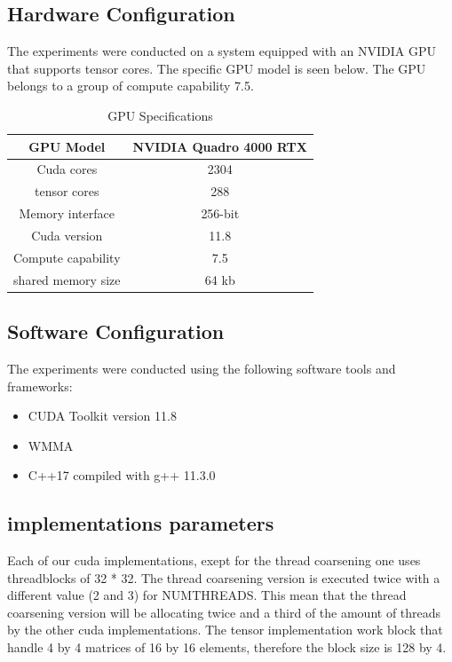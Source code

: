 \documentclass[conference]{IEEEtran}
\begin{document}
  \subsection{Hardware Configuration}\label{sec:hardware-configuration}
  
  The experiments were conducted on a system equipped with an NVIDIA GPU that supports tensor cores.
  The specific GPU model is seen below. The GPU belongs to a group of compute capability 7.5. 
  
  \begin{table}[htbp]
  \caption{GPU Specifications\cite{Voltatuningguide}}
  \centering
    \begin{tabular}{|c|c|}
    \hline
    GPU Model & NVIDIA Quadro 4000 RTX \\
    \hline
    Cuda cores & 2304 \\
    \hline
    tensor cores & 288 \\
    \hline
    Memory interface & 256-bit \\
    \hline
    Cuda version & 11.8 \\
    \hline
    Compute capability & 7.5 \\
    \hline
    shared memory size & 64 kb \\
    \hline
    
  \end{tabular}
  \end{table}
  
  \subsection{Software Configuration}\label{sec:software-configuration}
  
  The experiments were conducted using the following software tools and frameworks:
  
  \begin{itemize}
    \item CUDA Toolkit version 11.8
    \item WMMA
    \item C++17 compiled with g++ 11.3.0
  \end{itemize}
  \subsection{implementations parameters}
  Each of our cuda implementations, exept for the thread coarsening one uses threadblocks of 32 * 32.
  The thread coarsening version is executed twice with a different value (2 and 3) for NUMTHREADS. This
  mean that the thread coarsening version will be allocating twice and a third of the amount of threads
  by the other cuda implementations. The tensor implementation work block that handle 4 by 4 matrices of
  16 by 16 elements, therefore the block size is 128 by 4.
\end{document}
